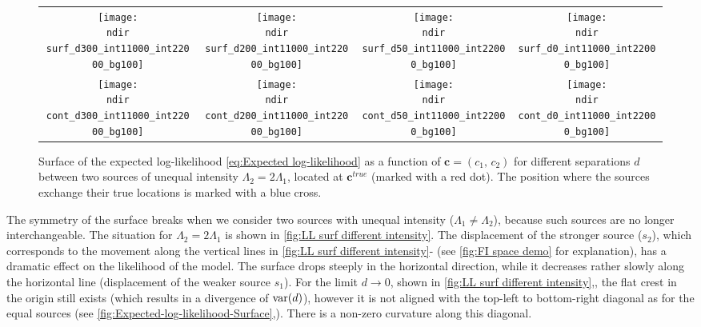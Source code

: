 \begin{figure}[!thb]
	\centering
	\newcommand{\sizeff}{.18}
	\newcommand{\sizegg}{.16}
	\newcommand{\ndir}{\qd gFREM/images/LLsurface/}
	\begin{tabular}{cccc}
		\subfloat[$d=300$ nm]{\texttt{[image: \\ndir surf\_d300\_int11000\_int22000\_bg100]}} 		
		& \subfloat[$d=200$ nm]{\texttt{[image: \\ndir surf\_d200\_int11000\_int22000\_bg100]}} 		
		& \subfloat[$d=50$ nm]{\texttt{[image: \\ndir surf\_d50\_int11000\_int22000\_bg100]}} 		
		& \subfloat[$d=0$ nm]{\texttt{[image: \\ndir surf\_d0\_int11000\_int22000\_bg100]}} 		
		\tabularnewline
		\subfloat[$d=300$ nm]{\texttt{[image: \\ndir cont\_d300\_int11000\_int22000\_bg100]}} 
		& \subfloat[$d=200$ nm]{\texttt{[image: \\ndir cont\_d200\_int11000\_int22000\_bg100]}} 		
		& \subfloat[$d=50$ nm]{\texttt{[image: \\ndir cont\_d50\_int11000\_int22000\_bg100]}} 		
		& \subfloat[$d=0$ nm]{\texttt{[image: \\ndir cont\_d0\_int11000\_int22000\_bg100]}} 		
		\tabularnewline
	\end{tabular}
	\caption{Surface of the expected log-likelihood \autoref{eq:Expected log-likelihood} as a function of $\bm{c}=(c_1,\, c_2)$ for different separations $d$ between two sources of unequal intensity $\Lambda_2=2\Lambda_1$, located at $\bm{c}^{true}$ (marked with a red dot). The position where the sources exchange their true locations is marked with a blue cross.}	
	\label{fig:LL surf different intensity}
\end{figure}
%
The symmetry of the surface breaks when we consider two sources with unequal intensity ($\Lambda_1\neq\Lambda_2$), because such sources are no longer interchangeable. The situation for $\Lambda_2=2\Lambda_1$ is shown in \autoref{fig:LL surf different intensity}. The displacement of the stronger source ($s_2$), which corresponds to the movement along the vertical lines in \autoref{fig:LL surf different intensity}\eee-\hhh{} (see \autoref{fig:FI space demo} for explanation), has a dramatic effect on the likelihood of the model. The surface drops steeply in the horizontal direction, while it decreases rather slowly along the horizontal line (displacement of the weaker source $s_1$). For the limit $d\rightarrow 0$, shown in \autoref{fig:LL surf different intensity}\ddd,\hhh, the flat crest in the origin still exists (which results in a divergence of $\mathrm{var}(d)$), however it is not aligned with the top-left to bottom-right diagonal as for the equal sources (see \autoref{fig:Expected-log-likelihood-Surface}\ddd,\hhh). There is a non-zero curvature along this diagonal.


